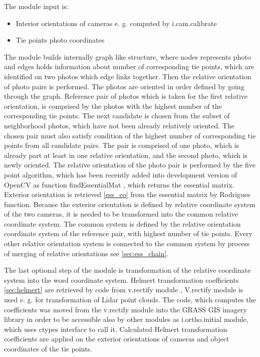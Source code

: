 \documentclass[a4paper,12pt]{article}
\begin{document}
The module input is: 
\begin{itemize}
\item Interior orientations of cameras e. g. computed by i.cam.calibrate
\item Tie points photo coordinates 
\end{itemize}

The module builds internally graph like structure, where nodes represents photo and edges holds information 
about number of corresponding tie points, which are identified on two photos which edge links together.
Then the relative orientation of photo pairs is performed. The photos are oriented in order defined by going through the graph. 
Reference pair of photos which is taken for the first relative orientation, is comprised by the photos with the highest number of the corresponding tie points.
The next candidate is chosen from the subset of neighborhood photos, which have not been already relatively oriented. The chosen pair 
must also satisfy condition of the highest number of corresponding tie points from all candidate pairs. The pair is comprised of one photo, which is already 
part at least in one relative orientation, and the second photo, which is newly oriented. The relative orientation of the photo 
pair is performed by  the five point algorithm, which has been recently added into development version of OpenCV as function findEssentialMat \cite{calib_manual2013opencv},
which returns the essential matrix. Exterior orientation is retrieved \ref{ess_eo} from the essential matrix by Rodrigues \cite{calib_manual2013opencv} 
function. Because the exterior orientation is defined by relative coordinate system of the two cameras, it is needed to be transformed into 
the common relative coordinate system. The common system is defined by the relative orientation coordinate system of the reference pair, with highest 
number of tie points.
Every other relative orientation system is connected to the common system by process of merging of relative orientations see \ref{sec:ess_chain}.

The last optional step of the module is transformation of the relative coordinate system into the word coordinate system. Helmert 
transformation coefficients \ref{sec:helmert} are retrieved by code from v.rectify module \cite{v.rectify}, 
V.rectify module is used e. g. for transformation of Lidar point clouds.
The code, which computes the coefficients
was moved from the v.rectify module into the GRASS GIS imagery library in order to be accessible also by other modules as i.ortho.initial
module, which uses ctypes interface to call it.
Calculated Helmert transformation coefficients are applied on the exterior orientations of cameras and object coordinates of the tie points.
\end{document}
